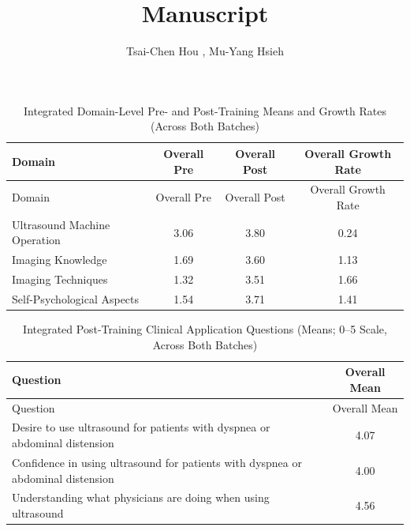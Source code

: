 \documentclass[a4paper,12pt]{article}
\title{Manuscript}
\author{Tsai-Chen Hou , Mu-Yang Hsieh}
\begin{document}
\maketitle



\clearpage

\begin{longtable}{lccc}
\caption{Integrated Domain-Level Pre- and Post-Training Means and Growth Rates (Across Both Batches)} \\
\toprule
Domain & Overall Pre & Overall Post & Overall Growth Rate \\
\midrule
\endfirsthead

\toprule
Domain & Overall Pre & Overall Post & Overall Growth Rate \\
\midrule
\endhead

\bottomrule
\endfoot

Ultrasound Machine Operation & 3.06 & 3.80 & 0.24 \\
Imaging Knowledge & 1.69 & 3.60 & 1.13 \\
Imaging Techniques & 1.32 & 3.51 & 1.66 \\
Self-Psychological Aspects & 1.54 & 3.71 & 1.41 \\
\end{longtable}

\vspace{1cm}

\begin{longtable}{p{12cm}c}
\caption{Integrated Post-Training Clinical Application Questions (Means; 0--5 Scale, Across Both Batches)} \\
\toprule
Question & Overall Mean \\
\midrule
\endfirsthead

\toprule
Question & Overall Mean \\
\midrule
\endhead

\bottomrule
\endfoot

Desire to use ultrasound for patients with dyspnea or abdominal distension & 4.07 \\
Confidence in using ultrasound for patients with dyspnea or abdominal distension & 4.00 \\
Understanding what physicians are doing when using ultrasound & 4.56 \\
\end{longtable}
\end{document}
